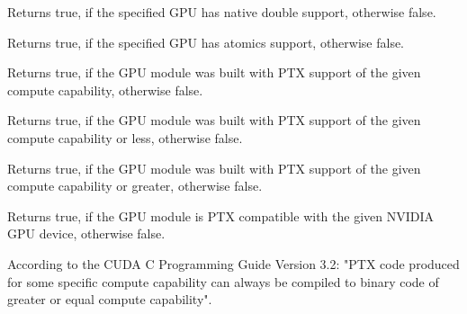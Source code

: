 Returns true, if the specified GPU has native double support, otherwise false.

\begin{description}
\end{description}


Returns true, if the specified GPU has atomics support, otherwise false.

\begin{description}
\end{description} 


Returns true, if the GPU module was built with PTX support of the given compute capability, otherwise false.

\begin{description}
\end{description}


Returns true, if the GPU module was built with PTX support of the given compute capability or less, otherwise false.

\begin{description}
\end{description}


Returns true, if the GPU module was built with PTX support of the given compute capability or greater, otherwise false.

\begin{description}
\end{description}


Returns true, if the GPU module is PTX compatible with the given NVIDIA GPU device, otherwise false.

\begin{description}
\end{description}

According to the CUDA C Programming Guide Version 3.2: "PTX code produced for some specific compute capability can always be compiled to binary code of greater or equal compute capability". 


